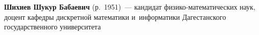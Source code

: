 \begin{multicols}{2}
 \vspace*{3pt}
 
 \noindent
\textbf{Шихиев Шукур Бабаевич} (р.\ 1951)~--- 
кандидат фи\-зи\-ко-ма\-те\-ма\-ти\-че\-ских наук, 
доцент кафедры дискретной математики и~информатики Дагестанского государственного университета






\def\leftkol{ОБ АВТОРАХ}

\def\rightkol{ОБ АВТОРАХ}


 \label{end\stat}



\end{multicols}

\def\leftkol{ОБ АВТОРАХ}
\def\rightkol{ОБ АВТОРАХ}

\newpage
